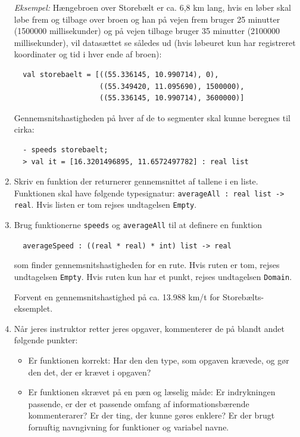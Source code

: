 \documentclass[a4paper,12pt]{article}
\begin{document}
\begin{enumerate}[{2}G1]
  \textit{Eksempel:} Hængebroen over Storebælt er ca. 6,8 km lang,
  hvis en løber skal løbe frem og tilbage over broen og han på vejen
  frem bruger 25 minutter (1500000 millisekunder) og på vejen tilbage
  bruger 35 minutter (2100000 millisekunder), vil datasættet se
  således ud (hvis løbeuret kun har registreret koordinater og tid i hver ende af
  broen):
\begin{verbatim}
  val storebaelt = [((55.336145, 10.990714), 0),
                    ((55.349420, 11.095690), 1500000),
                    ((55.336145, 10.990714), 3600000)]
\end{verbatim}
Gennemsnitshastigheden på hver af de to segmenter skal kunne
beregnes til cirka:
\begin{verbatim}
  - speeds storebaelt;
  > val it = [16.3201496895, 11.6572497782] : real list
\end{verbatim}

\item Skriv en funktion der returnerer gennemsnittet af tallene i en
  liste.  Funktionen skal have følgende typesignatur:
  \verb|averageAll : real list -> real|. Hvis listen er tom rejses
  undtagelsen \verb|Empty|.

\item Brug funktionerne \verb|speeds| og \verb|averageAll| til at
  definere en funktion

  \verb|  averageSpeed : ((real * real) * int) list -> real|

  som finder gennemsnitshastigheden for en rute.  Hvis ruten er tom,
  rejses undtagelsen \verb|Empty|.  Hvis ruten kun har et punkt,
  rejses undtagelsen \verb|Domain|.

  Forvent en gennemsnitshastighed på ca. 13.988 km/t for
  Storebælts-eksemplet.

\item Når jeres instruktor retter jeres opgaver, kommenterer de på
  blandt andet følgende punkter:

\begin{itemize}

\item Er funktionen korrekt: Har den den type, som opgaven krævede, og
  gør den det, der er krævet i opgaven?

\item Er funktionen skrævet på en pæn og læselig måde: Er indrykningen
  passende, er der et passende omfang af informationsbærende
  kommenterarer?  Er der ting, der kunne gøres enklere? Er der brugt
  fornuftig navngivning for funktioner og variabel navne.


\end{itemize}
\end{enumerate}
\end{document}
